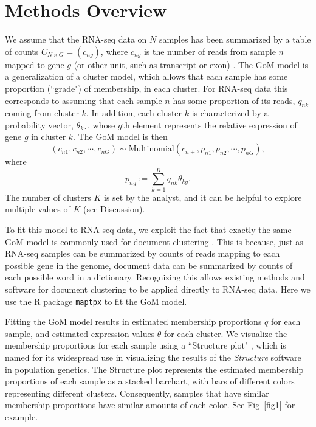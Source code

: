 \documentclass[10pt,letterpaper]{article}
\begin{document}

\section*{Methods Overview}

We assume that the RNA-seq data on $N$ samples has been summarized by a table of counts $C_{N \times G} = (c_{ng})$,
where $c_{ng}$ is the number of reads from sample $n$ mapped to gene $g$ (or other unit, such as transcript or exon) \cite{Oshlack2010}.
The GoM model is a generalization of a cluster model, which allows that each sample has some proportion (``grade") of membership,
in each cluster.  For RNA-seq data this corresponds to
assuming that each sample $n$ has some proportion of its reads, $q_{nk}$ coming from cluster $k$.
In addition, each cluster $k$ is characterized by a probability vector, $\theta_{k\cdot}$, whose $g$th element represents
the relative expression of gene $g$ in cluster $k$.
The GoM model is then
\begin{equation} \label{eqn:mult}
\left ( c_{n1}, c_{n2}, \cdots, c_{nG} \right) \sim \text{Multinomial} \left(c_{n+}, p_{n1}, p_{n2}, \cdots, p_{nG} \right),
\end{equation}
where
\begin{equation} \label{eqn:gom}
p_{ng} := \sum_{k=1}^{K} q_{nk}\theta_{kg}.
\end{equation}
The number of clusters $K$ is set by the analyst, and it can be helpful to explore multiple
values of $K$ (see Discussion).

To fit this model to RNA-seq data, we exploit the fact that exactly the same GoM model is commonly used for document clustering \cite{Blei2003}.
This is because, just as RNA-seq samples can be summarized by counts of reads mapping to each possible gene in the genome,
document data can be summarized by counts of each possible word in a dictionary.
Recognizing this allows existing methods and software for document clustering to be applied directly to RNA-seq data. Here we use the R package {\tt maptpx} \cite{Taddy2012} to fit the GoM model.

Fitting the GoM model results in estimated membership proportions $q$ for each sample, and estimated expression values $\theta$ for each cluster. We visualize the membership proportions for each sample using a ``Structure plot" \cite{Rosenberg2002},
which is named for its widespread use in visualizing the results of the {\it Structure} software \cite{Pritchard2000} in population genetics.
The Structure plot represents the estimated membership proportions of each sample
as a stacked barchart, with bars of different colors representing  different clusters. Consequently, samples that have similar membership proportions have similar amounts of each color. See Fig~\ref{fig1} for example.
\end{document}
